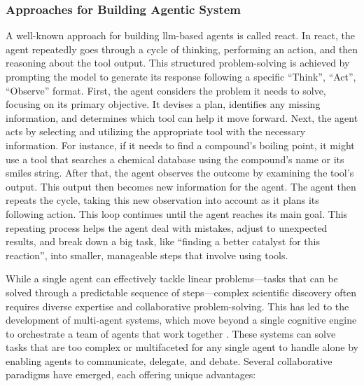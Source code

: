 \subsubsection{Approaches for Building Agentic System}

A well-known approach for building \gls{llm}-based agents is called \gls{react}\autocite{yao2023react}. In \gls{react}, the agent repeatedly goes through a cycle of thinking, performing an action, and then reasoning about the tool output. 
This structured problem-solving is achieved by prompting the model to generate its response following a specific \enquote{Think}, \enquote{Act}, \enquote{Observe} format.
First, the agent considers the problem it needs to solve, focusing on its primary objective. It devises a plan, identifies any missing information, and determines which tool can help it move forward. Next, the agent acts by selecting and utilizing the appropriate tool with the necessary information. For instance, if it needs to find a compound's boiling point, it might use a tool that searches a chemical database using the compound's name or its \gls{smiles} string. After that, the agent observes the outcome by examining the tool's output. This output then becomes new information for the agent. The agent then repeats the cycle, taking this new observation into account as it plans its following action. This loop continues until the agent reaches its main goal. This repeating process helps the agent deal with mistakes, adjust to unexpected results, and break down a big task, like \enquote{finding a better catalyst for this reaction}, into smaller, manageable steps that involve using tools.

While a single agent can effectively tackle linear problems---tasks that can be solved through a predictable sequence of steps---complex scientific discovery often requires diverse expertise and collaborative problem-solving. This has led to the development of multi-agent systems, which move beyond a single cognitive engine to orchestrate a team of agents that work together \autocite{wu2023autogen}. These systems can solve tasks that are too complex or multifaceted for any single agent to handle alone by enabling agents to communicate, delegate, and debate. \autocite{lazaridou2020emergent}
Several collaborative paradigms have emerged, each offering unique advantages:

